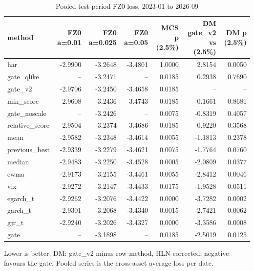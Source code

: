 \begin{table}[t]
\centering
\small
\caption{Pooled test-period FZ0 loss, 2023-01 to 2026-09}
\label{tab:main}
\begin{tabular}{lrrrrrr}
\toprule
method & FZ0 a=0.01 & FZ0 a=0.025 & FZ0 a=0.05 & MCS p (2.5\%) & DM gate\_v2 vs (2.5\%) & DM p (2.5\%) \\
\midrule
har & -2.9900 & -3.2648 & -3.4801 & 1.0000 & 2.8154 & 0.0050 \\
gate\_qlike & -- & -3.2471 & -- & 0.0185 & 0.2938 & 0.7690 \\
gate\_v2 & -2.9706 & -3.2450 & -3.4658 & 0.0185 & -- & -- \\
min\_score & -2.9608 & -3.2436 & -3.4743 & 0.0185 & -0.1661 & 0.8681 \\
gate\_noscale & -- & -3.2426 & -- & 0.0075 & -0.8319 & 0.4057 \\
relative\_score & -2.9504 & -3.2374 & -3.4686 & 0.0185 & -0.9220 & 0.3568 \\
mean & -2.9582 & -3.2348 & -3.4614 & 0.0055 & -1.1813 & 0.2378 \\
previous\_best & -2.9339 & -3.2279 & -3.4621 & 0.0075 & -1.7764 & 0.0760 \\
median & -2.9483 & -3.2250 & -3.4528 & 0.0005 & -2.0809 & 0.0377 \\
ewma & -2.9173 & -3.2155 & -3.4461 & 0.0055 & -2.8412 & 0.0046 \\
vix & -2.9272 & -3.2147 & -3.4433 & 0.0175 & -1.9528 & 0.0511 \\
egarch\_t & -2.9262 & -3.2076 & -3.4422 & 0.0000 & -3.7282 & 0.0002 \\
garch\_t & -2.9301 & -3.2068 & -3.4340 & 0.0015 & -2.7421 & 0.0062 \\
gjr\_t & -2.9240 & -3.2026 & -3.4327 & 0.0000 & -3.3586 & 0.0008 \\
gate & -- & -3.1898 & -- & 0.0185 & -2.5019 & 0.0125 \\
\bottomrule
\end{tabular}
\par\footnotesize Lower is better. DM: gate_v2 minus row method, HLN-corrected; negative favours the gate. Pooled series is the cross-asset average loss per date.
\end{table}
